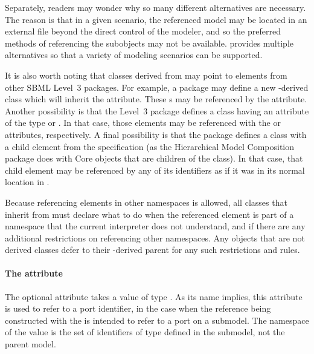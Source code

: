 Separately, readers may wonder why so many different alternatives are
necessary.  The reason is that in a given scenario, the referenced model
may be located in an external file beyond the direct control of the
modeler, and so the preferred methods of referencing the subobjects may
not be available.  \SBaseRef provides multiple alternatives so that a
variety of modeling scenarios can be supported.

It is also worth noting that classes derived from \SBaseRef may point to
elements from other SBML Level~3 packages.  For example, a package may
define a new \SBase-derived class which will inherit the 
attribute.  These s may be referenced by the \SBaseRef
{} attribute.  Another possibility is that the Level~3
package defines a class having an attribute of the type  or
.  In that case, those elements may be referenced with
the  or  attributes, respectively.  A final
possibility is that the package defines a class with a child element
from the \sbmlthreecore specification (as the Hierarchical Model
Composition package does with Core \Model objects that are children of
the \ListOfModelDefinitions class).  In that case, that child element
may be referenced by any of its identifiers as if it was in its normal
location in \sbmlthreecore.

Because referencing elements in other namespaces is allowed, all classes
that inherit from \SBaseRef must declare what to do when the referenced
element is part of a namespace that the current interpreter does not
understand, and if there are any additional restrictions on referencing
other namespaces.  Any \SBaseRef objects that are not derived classes
defer to their \SBaseRef-derived parent for any such restrictions and
rules.


\paragraph{The \fixttspace{} attribute}
\label{sbaseref-portref}

The optional attribute  takes a value of type
.  As its name implies, this attribute is used to
refer to a port identifier, in the case when the reference being
constructed with the \SBaseRef is intended to refer to a port on a
submodel.  The namespace of the  value is the set
of identifiers of type  defined in the submodel, not
the parent model.


